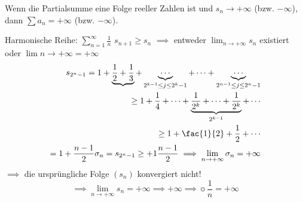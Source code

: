\begin{Bem}
  Wenn die Partialsumme eine Folge reeller Zahlen ist und $s_n\to+\infty$ (bzw. $-\infty$), dann $\sum a_n=+\infty$ (bzw. $-\infty$).
\end{Bem}
\begin{Bsp}
  Harmonische Reihe: $\sum^\infty_{n=1}\frac{1}{n}$ $s_{n+1}\geq s_n$ $\implies$ entweder $\lim_{n\to+\infty}s_n$ existiert oder $\lim{n\to+\infty}=+\infty$
  \begin{align*}
    s_{2^n-1}=1+\underbrace{\frac{1}{2}+\frac{1}{3}}+\underbrace{\cdots}_{2^{k-1}\leq j\leq 2^k-1}+\cdots+\underbrace{\cdots}_{2^{n-1}\leq j\leq 2^n-1}\\
    \geq 1+\frac{1}{4}+\cdots+\underbrace{\frac{1}{2^k}+\cdots+\frac{1}{2^k}}_{2^{k-1}}+\cdots\\
    \geq 1+\fac{1}{2}+\frac{1}{2}+ \cdots\\
    =1+\frac{n-1}{2}
    \sigma_n=s_{2^n-1}\geq +1\frac{n-1}{2}\implies\lim_{n\to+\infty}\sigma_n=+\infty
  \end{align*}
  $\implies$ die ursprüngliche Folge $(s_n)$ konvergiert nicht! 
  \[\implies \lim_{n\to+\infty}s_n=+\infty\implies+\infty \implies \sun\frac{1}{n}=+\infty\]
\end{Bsp}
